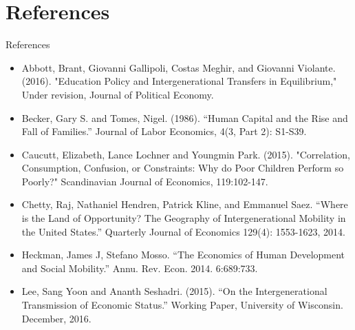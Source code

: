 \documentclass{beamer}
\begin{document}
\section{References}
\begin{frame}{References}
\begin{footnotesize}
\begin{itemize}
\item Abbott, Brant, Giovanni Gallipoli, Costas Meghir, and Giovanni Violante. (2016). "Education Policy and Intergenerational Transfers in Equilibrium," Under revision, Journal of Political Economy. 

\item Becker, Gary S. and Tomes, Nigel. (1986). ``Human Capital and the Rise and Fall of Families.'' Journal of Labor Economics, 4(3, Part 2): S1-S39.

\item Caucutt, Elizabeth, Lance Lochner and Youngmin Park. (2015). "Correlation, Consumption, Confusion, or Constraints: Why do Poor Children Perform so Poorly?" Scandinavian Journal of Economics, 119:102-147.

\item Chetty, Raj, Nathaniel Hendren, Patrick Kline, and Emmanuel Saez. ``Where is the Land of Opportunity? The Geography of Intergenerational Mobility in the United States.'' Quarterly Journal of Economics 129(4): 1553-1623, 2014.



\item Heckman, James J, Stefano Mosso. ``The Economics of Human Development and Social Mobility.'' Annu. Rev. Econ. 2014. 6:689:733.

\item  Lee, Sang Yoon and  Ananth Seshadri. (2015). ``On the Intergenerational Transmission of Economic Status.'' Working Paper, University of Wisconsin. December, 2016.


\end{itemize}
\end{footnotesize}
\end{frame}
\end{document}
